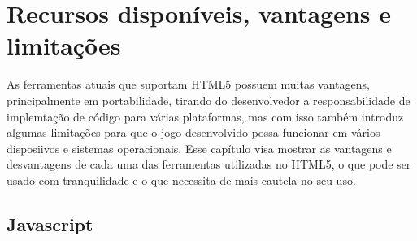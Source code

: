 \section{Recursos disponíveis, vantagens e limitações}

As ferramentas atuais que suportam HTML5 possuem muitas vantagens,
principalmente em portabilidade, tirando do desenvolvedor a
responsabilidade de implemtação de código para várias plataformas, mas
com isso também introduz algumas limitações para que o jogo
desenvolvido possa funcionar em vários disposiivos e sistemas
operacionais. Esse capítulo visa mostrar as vantagens e desvantagens
de cada uma das ferramentas utilizadas no HTML5, o que pode ser usado
com tranquilidade e o que necessita de mais cautela no seu uso.

\subsection{Javascript}

